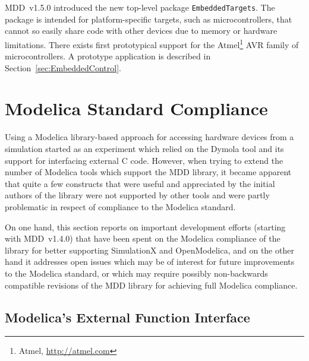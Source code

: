 \documentclass{resources/modelica}
\newcommand{\modelica}[1]{\lstinline[language=modelica]|#1|}
\newcommand{\BTHI}[1]{}
\begin{document}
MDD~v1.5.0 introduced the new top-level package \modelica{EmbeddedTargets}. The
package is intended for platform-specific targets, such as microcontrollers,
that cannot so easily share code with other devices due to memory or hardware
limitations.
There exists first prototypical support for the
Atmel\footnote{Atmel, \url{http://atmel.com}} AVR family of
microcontrollers. A prototype application is described in
Section~\ref{sec:EmbeddedControl}.

\section{Modelica Standard Compliance}
\label{sec:ModelicaStandardCompliance}
\BTHI{TODO: Thomas, Bernhard}

Using a Modelica library-based approach for accessing hardware devices from a
simulation started as an experiment which relied on the Dymola tool and its
support for interfacing external C code.
However, when trying to extend the number
of Modelica tools which support the MDD library, it became apparent that quite a
few constructs that were useful and appreciated by the initial authors of the
library were not supported by other tools and were partly problematic in respect
of compliance to the Modelica standard.

On one hand, this section reports on
important development efforts (starting with MDD~v1.4.0) that have been spent on the
Modelica compliance of the library for better supporting SimulationX and
OpenModelica, and on the other hand it addresses open issues which may
be of interest for future improvements to the Modelica standard, or which
may require possibly non-backwards compatible revisions of the MDD library for
achieving full Modelica compliance.

\subsection{Modelica's External Function Interface}
\end{document}
